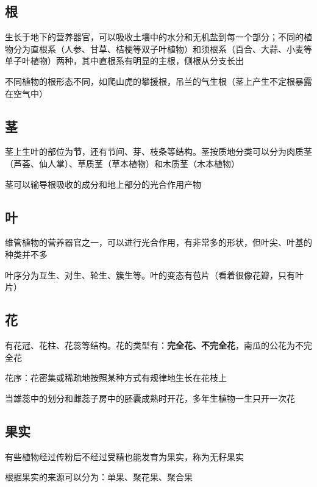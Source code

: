 \subsection{根}%
\label{sub:根}
生长于地下的营养器官，可以吸收土壤中的水分和无机盐到每一个部分；不同的植物分为直根系（人参、甘草、桔梗等双子叶植物）和须根系（百合、大蒜、小麦等单子叶植物）两种，其中直根系有明显的主根，侧根从分支长出

不同植物的根形态不同，如爬山虎的攀援根，吊兰的气生根（茎上产生不定根暴露在空气中）
\subsection{茎}%
\label{sub:茎}
茎上生叶的部位为\textbf{节}，还有节间、芽、枝条等结构。茎按质地分类可以分为肉质茎（芦荟、仙人掌）、草质茎（草本植物）和木质茎（木本植物）

茎可以输导根吸收的成分和地上部分的光合作用产物
\subsection{叶}%
\label{sub:叶}
维管植物的营养器官之一，可以进行光合作用，有非常多的形状，但叶尖、叶基的种类并不多

叶序分为互生、对生、轮生、簇生等。叶的变态有苞片（看着很像花瓣，只有叶片）
\subsection{花}%
\label{sub:花}
有花冠、花柱、花蕊等结构。花的类型有：\textbf{完全花、不完全花}，南瓜的公花为不完全花
\begin{notation}
花序：花密集或稀疏地按照某种方式有规律地生长在花枝上
\end{notation}
当雄蕊中的划分和雌蕊子房中的胚囊成熟时开花，多年生植物一生只开一次花
\subsection{果实}%
\label{sub:果实}
有些植物经过传粉后不经过受精也能发育为果实，称为无籽果实

根据果实的来源可以分为：单果、聚花果、聚合果
